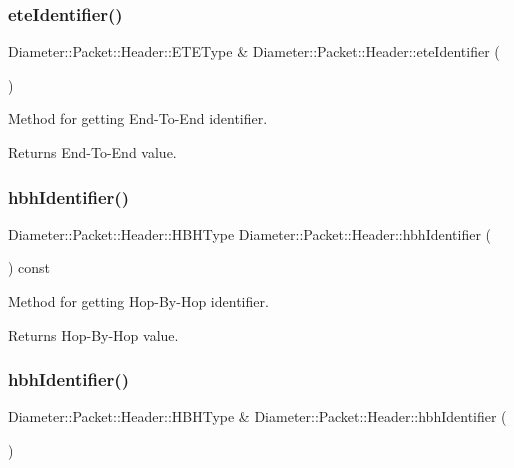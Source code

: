 \subsubsection{\texorpdfstring{ete\+Identifier()}{eteIdentifier()}\hspace{0.1cm}{\footnotesize\ttfamily [2/2]}}
{\footnotesize\ttfamily Diameter\+::\+Packet\+::\+Header\+::\+E\+T\+E\+Type \& Diameter\+::\+Packet\+::\+Header\+::ete\+Identifier (\begin{DoxyParamCaption}{ }\end{DoxyParamCaption})}



Method for getting End-\/\+To-\/\+End identifier. 

\begin{DoxyReturn}{Returns}
End-\/\+To-\/\+End value. 
\end{DoxyReturn}
\mbox{\label{classDiameter_1_1Packet_1_1Header_a52c9e1cf5ccc5902e9950c35b35edb28}} 
\subsubsection{\texorpdfstring{hbh\+Identifier()}{hbhIdentifier()}\hspace{0.1cm}{\footnotesize\ttfamily [1/2]}}
{\footnotesize\ttfamily Diameter\+::\+Packet\+::\+Header\+::\+H\+B\+H\+Type Diameter\+::\+Packet\+::\+Header\+::hbh\+Identifier (\begin{DoxyParamCaption}{ }\end{DoxyParamCaption}) const}



Method for getting Hop-\/\+By-\/\+Hop identifier. 

\begin{DoxyReturn}{Returns}
Hop-\/\+By-\/\+Hop value. 
\end{DoxyReturn}
\mbox{\label{classDiameter_1_1Packet_1_1Header_abd0b298c5185b43c44e10a52d497b85d}} 
\subsubsection{\texorpdfstring{hbh\+Identifier()}{hbhIdentifier()}\hspace{0.1cm}{\footnotesize\ttfamily [2/2]}}
{\footnotesize\ttfamily Diameter\+::\+Packet\+::\+Header\+::\+H\+B\+H\+Type \& Diameter\+::\+Packet\+::\+Header\+::hbh\+Identifier (\begin{DoxyParamCaption}{ }\end{DoxyParamCaption})}



